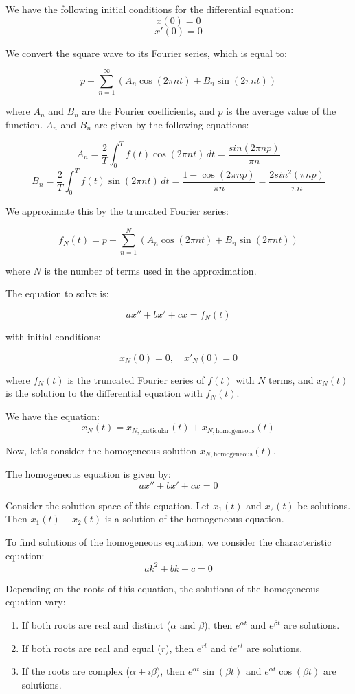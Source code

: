 \documentclass{article}
\begin{document}
We have the following initial conditions for the differential equation:
\[ x(0) = 0 \]
\[ x'(0) = 0 \]

We convert the square wave to its Fourier series, which is equal to:

\[
p + \sum_{n=1}^{\infty} \left( A_n \cos(2\pi n t) + B_n \sin(2\pi n t) \right)
\]

where \( A_n \) and \( B_n \) are the Fourier coefficients, and \( p \) is the average value of the function.
\(A_n\) and \(B_n\) are given by the following equations:

\[A_n = \frac{2}{T} \int_{0}^{T} f(t) \cos(2\pi n t) \, dt = \frac{sin(2 \pi n p)}{\pi n}\]
\[B_n = \frac{2}{T} \int_{0}^{T} f(t) \sin(2\pi n t) \, dt = \frac{1 - \cos(2 \pi n p)}{\pi n}= \frac{2 sin^2(\pi n p)}{\pi n}\]

We approximate this by the truncated Fourier series:

\[
f_N(t) = p + \sum_{n=1}^{N} \left( A_n \cos(2\pi n t) + B_n \sin(2\pi n t) \right)
\]

where \( N \) is the number of terms used in the approximation.

The equation to solve is:

\[
ax'' + bx' + cx = f_N(t)
\]

with initial conditions:

\[
x_N(0) = 0, \quad x'_N(0) = 0
\]

where \( f_N(t) \) is the truncated Fourier series of \( f(t) \) with \( N \) terms,
and \( x_N(t) \) is the solution to the differential equation with \( f_N(t) \).

We have the equation:
\begin{equation}
x_N(t) = x_{N,\text{particular}}(t) + x_{N,\text{homogeneous}}(t)
\end{equation}

Now, let's consider the homogeneous solution \(x_{N,\text{homogeneous}}(t)\). 

The homogeneous equation is given by:
\[
ax'' + bx' + cx = 0
\]

Consider the solution space of this equation. Let \(x_1(t)\) and \(x_2(t)\) be solutions. Then \(x_1(t) - x_2(t)\) is a solution of the homogeneous equation.

To find solutions of the homogeneous equation, we consider the characteristic equation:
\[
a k^2 + b k + c = 0
\]

Depending on the roots of this equation, the solutions of the homogeneous equation vary:
\begin{enumerate}
    \item If both roots are real and distinct (\( \alpha \) and \( \beta \)), then \( e^{\alpha t} \) and \( e^{\beta t} \) are solutions.
    \item If both roots are real and equal (\( r \)), then \( e^{rt} \) and \( t e^{rt} \) are solutions.
    \item If the roots are complex (\( \alpha \pm i \beta \)), then \( e^{\alpha t} \sin(\beta t) \) and \( e^{\alpha t} \cos(\beta t) \) are solutions.
\end{enumerate}
\end{document}
